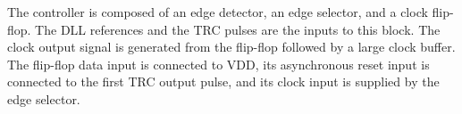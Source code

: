 \documentclass[graybox]{svmult}
\begin{document}
The controller is composed of an edge detector, an edge selector, and a clock flip-flop.
The DLL references and the TRC pulses are the inputs to this block.
The clock output signal is generated from the flip-flop followed by a large clock buffer.
The flip-flop data input is connected to VDD, its asynchronous reset input is connected to the first TRC output pulse, and its clock input is supplied by the edge selector.
\end{document}
